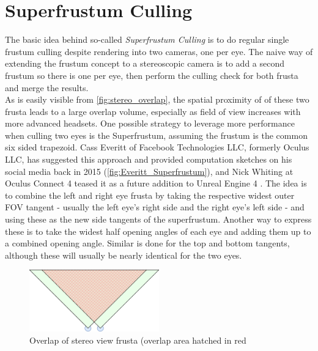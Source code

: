 \section{Superfrustum Culling} \label{SFrust}
The basic idea behind so-called \textit{Superfrustum Culling} is to do regular single frustum culling despite rendering into two cameras, one per eye. The naive way of extending the frustum concept to a stereoscopic camera is to add a second frustum so there is one per eye, then perform the culling check for both frusta and merge the results. \\
As is easily visible from \autoref{fig:stereo_overlap}, the spatial proximity of of these two frusta leads to a large overlap volume, especially as field of view increases with more advanced headsets. One possible strategy to leverage more performance when culling two eyes is the Superfrustum, assuming the frustum is the common six sided trapezoid. Cass Everitt of Facebook Technologies LLC, formerly Oculus LLC, has suggested this approach and provided computation sketches on his social media back in 2015 \cite{Everitt.2015}(\autoref{fig:Everitt_Superfrustum}), and Nick Whiting at Oculus Connect 4 teased it as a future addition to Unreal Engine 4 \cite{Whiting.2017}. The idea is to combine the left and right eye frusta by taking the respective widest outer FOV tangent - usually the left eye's right side and the right eye's left side - and using these as the new side tangents of the superfrustum. Another way to express these is to take the widest half opening angles of each eye and adding them up to a combined opening angle. Similar is done for the top and bottom tangents, although these will usually be nearly identical for the two eyes. \\

\begin{figure}[htb]
  \centering
  \includegraphics[width=0.5\textwidth ,angle=12,origin=c]{pictures/frusta}
  \caption{Overlap of stereo view frusta (overlap area hatched in red} \label{fig:stereo_overlap}
\end{figure}

